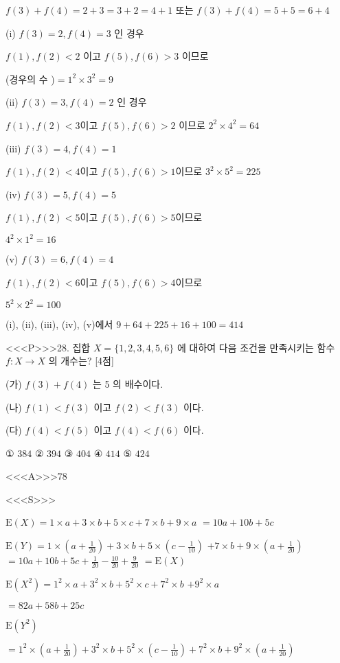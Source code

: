 \documentclass{oblivoir}
\begin{document}
$f(3)+f(4)=2+3=3+2=4+1$ 또는 $f(3)+f(4)=5+5=6+4$

(i) $f(3)=2, f(4)=3$ 인 경우

$f(1), f(2)<2$ 이고 $f(5), f(6)>3$ 이므로

(경우의 수 )$=1^{2} \times 3^{2}=9$

(ii) $f(3)=3, f(4)=2$ 인 경우

$f(1), f(2)<3$이고 $f(5), f(6)>2$ 이므로 $2^{2} \times 4^{2}=64$


(iii) $f(3)=4, f(4)=1$

$f(1), f(2)<4$이고 $f(5), f(6)>1 $이므로 $3^{2} \times 5^{2}=225$

(iv) $f(3)=5, f(4)=5$

$f(1), f(2)<5$이고 $f(5), f(6)>5 $이므로

$4^{2} \times 1^{2}=16$

(v) $f(3)=6, f(4)=4$

$f(1), f(2)<6$이고 $f(5), f(6)>4 $이므로 

$5^{2} \times 2^{2}=100$

(i), (ii), (iii), (iv), (v)에서 $ 9+64+225+16+100=414$

<<<P>>>28. 집합 $X=\{1,2,3,4,5,6\}$ 에 대하여 다음 조건을 만족시키는 함수 $f: X \rightarrow X$ 의 개수는? [4점]

(가) $f(3)+f(4)$ 는 5 의 배수이다.

(나) $f(1)<f(3)$ 이고 $f(2)<f(3)$ 이다.

(다) $f(4)<f(5)$ 이고 $f(4)<f(6)$ 이다.

① $384$
② $394$
③ $404$
④ $414$
⑤ $424$


<<<A>>>$78$

<<<S>>>



$\mathrm{E}(X)=1 \times a+3 \times b+5 \times c+7 \times b+9 \times a$
$=10 a+10 b+5 c$

$\mathrm{E}(Y)=1 \times\left(a+\frac{1}{20}\right)+3 \times b+5 \times\left(c-\frac{1}{10}\right)$
$+7 \times b+9 \times\left(a+\frac{1}{20}\right)$
$=10 a+10 b+5 c+\frac{1}{20}-\frac{10}{20}+\frac{9}{20}$
$=\mathrm{E}(X)$

$\mathrm{E}\left(X^{2}\right)=1^{2} \times a+3^{2} \times b+5^{2} \times c+7^{2} \times b$
$+9^{2} \times a$

$=82 a+58 b+25 c$

$ \mathrm{E}\left(Y^{2}\right)$

$=1^{2} \times\left(a+\frac{1}{20}\right)+3^{2} \times b+5^{2} \times\left(c-\frac{1}{10}\right) +7^{2} \times b+9^{2} \times\left(a+\frac{1}{20}\right)$
\end{document}
